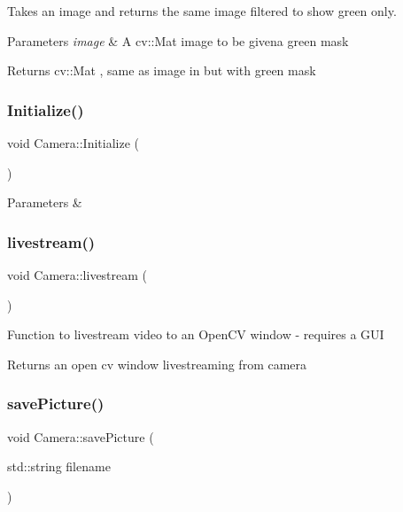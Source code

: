 Takes an image and returns the same image filtered to show green only. 


\begin{DoxyParams}{Parameters}
{\em image} & A cv\+::\+Mat image to be givena green mask \\
\hline
\end{DoxyParams}
\begin{DoxyReturn}{Returns}
cv\+::\+Mat , same as image in but with green mask 
\end{DoxyReturn}
\mbox{\label{classCamera_afd88c2780203f02c9fe236a7239e414c}} 
\subsubsection{\texorpdfstring{Initialize()}{Initialize()}}
{\footnotesize\ttfamily void Camera\+::\+Initialize (\begin{DoxyParamCaption}{ }\end{DoxyParamCaption})}


\begin{DoxyParams}{Parameters}
{\em } & \\
\hline
\end{DoxyParams}
\mbox{\label{classCamera_af0d3c970e947813e71f316b9e499b456}} 
\subsubsection{\texorpdfstring{livestream()}{livestream()}}
{\footnotesize\ttfamily void Camera\+::livestream (\begin{DoxyParamCaption}{ }\end{DoxyParamCaption})}

Function to livestream video to an Open\+CV window -\/ requires a G\+UI

\begin{DoxyReturn}{Returns}
an open cv window livestreaming from camera 
\end{DoxyReturn}
\mbox{\label{classCamera_ad0c5cc34e0b16ab7925d2c432ece20de}} 
\subsubsection{\texorpdfstring{save\+Picture()}{savePicture()}}
{\footnotesize\ttfamily void Camera\+::save\+Picture (\begin{DoxyParamCaption}\item[{std\+::string}]{filename }\end{DoxyParamCaption})}

